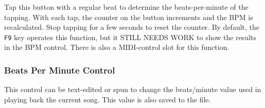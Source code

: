    Tap this button with a regular beat to determine the beats-per-minute of the
   tapping.  With each tap, the counter on the button increments and the BPM is
   recalculated.  Stop tapping for a few seconds to reset the counter.
   By default, the \texttt{F9} key operates this function, but it
   STILL NEEDS WORK to show the results in the BPM control.
   There is also a MIDI-control slot for this function.

\subsubsection{Beats Per Minute Control}
\label{subsubsec:introduction_bpm_control}

   This control can be text-edited or spun to change the beats/minute value
   used in playing back the current song.  This value is also saved to the
   file.

